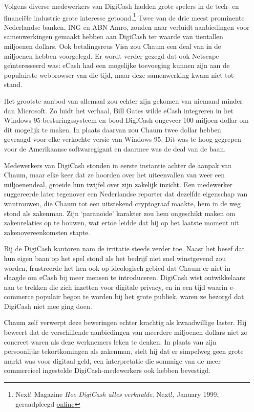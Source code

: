\documentclass[
  a5paper,
  smalldemyvopaper,11pt,twoside,onecolumn,openright,extrafontsizes,
hidelinks]{memoir}
\begin{document}
Volgens diverse medewerkers van DigiCash hadden grote spelers in de
tech- en financiële industrie grote interesse getoond.\footnote{Next!
  Magazine \emph{Hoe DigiCash alles verknalde}, Next!, January 1999,
  geraadpleegd
  \href{https://web.archive.org/web/19990427142412/https://www.nextmagazine.nl/ecash.htm}{online}}
Twee van de drie meest prominente Nederlandse banken, ING en ABN Amro,
zouden naar verluidt aanbiedingen voor samenwerkingen gemaakt hebben aan
DigiCash ter waarde van tientallen miljoenen dollars. Ook betalingsreus
Visa zou Chaum een deal van in de miljoenen hebben voorgelegd. Er wordt
verder gezegd dat ook Netscape geïnteresseerd was: eCash had een
mogelijke toevoeging kunnen zijn aan de populairste webbrowser van die
tijd, maar deze samenwerking kwam niet tot stand.

Het grootste aanbod van allemaal zou echter zijn gekomen van niemand
minder dan Microsoft. Zo luidt het verhaal, Bill Gates wilde eCash
integreren in het Windows 95-besturingssysteem en bood DigiCash ongeveer
100 miljoen dollar om dit mogelijk te maken. In plaats daarvan zou Chaum
twee dollar hebben gevraagd voor elke verkochte versie van Windows 95.
Dit was te hoog gegrepen voor de Amerikaanse softwaregigant en daarmee
was de deal van de baan.

Medewerkers van DigiCash stonden in eerste instantie achter de aanpak
van Chaum, maar elke keer dat ze hoorden over het uiteenvallen van weer
een miljoenendeal, groeide hun twijfel over zijn zakelijk inzicht. Een
medewerker suggereerde later tegenover een Nederlandse reporter dat
dezelfde eigenschap van wantrouwen, die Chaum tot een uitstekend
cryptograaf maakte, hem in de weg stond als zakenman. Zijn `paranoïde'
karakter zou hem ongeschikt maken om zakenrelaties op te bouwen, wat
ertoe leidde dat hij op het laatste moment uit zakenovereenkomsten
stapte.

Bij de DigiCash kantoren nam de irritatie steeds verder toe. Naast het
besef dat hun eigen baan op het spel stond als het bedrijf niet snel
winstgevend zou worden, frustreerde het hen ook op ideologisch gebied
dat Chaum er niet in slaagde om eCash bij meer mensen te introduceren.
DigiCash wist ontwikkelaars aan te trekken die zich inzetten voor
digitale privacy, en in een tijd waarin e-commerce populair begon te
worden bij het grote publiek, waren ze bezorgd dat DigiCash niet mee
ging doen.

Chaum zelf verwerpt deze beweringen echter krachtig als kwaadwillige
laster. Hij beweert dat de verschillende aanbiedingen van meerdere
miljoenen dollars niet zo concreet waren als deze werknemers leken te
denken. In plaats van zijn persoonlijke tekortkomingen als zakenman,
stelt hij dat er simpelweg geen grote markt was voor digitaal geld, een
interpretatie die sommige van de meer commercieel ingestelde
DigiCash-medewerkers ook hebben bevestigd.
\end{document}
